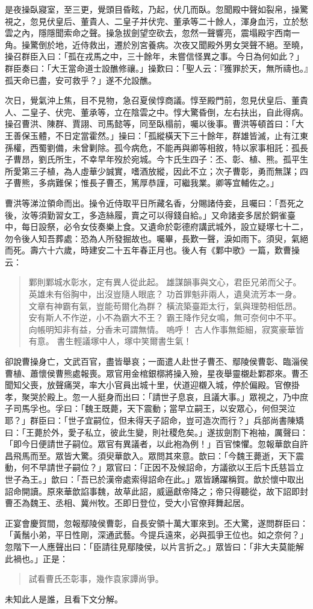 是夜操臥寢室，至三更，覺頭目昏眩，乃起，伏几而臥。忽聞殿中聲如裂帛，操驚視之，忽見伏皇后、董貴人、二皇子并伏完、董承等二十餘人，渾身血污，立於愁雲之內，隱隱聞索命之聲。操急拔劍望空砍去，忽然一聲響亮，震塌殿宇西南一角。操驚倒於地，近侍救出，遷於別宮養病。次夜又聞殿外男女哭聲不絕。至曉，操召群臣入曰：「孤在戎馬之中，三十餘年，未嘗信怪異之事。今日為何如此？」群臣奏曰：「大王當命道士設醮修禳。」操歎曰：「聖人云：『獲罪於天，無所禱也。』孤天命已盡，安可救乎？」遂不允設醮。

次日，覺氣沖上焦，目不見物，急召夏侯惇商議。惇至殿門前，忽見伏皇后、董貴人、二皇子、伏完、董承等，立在陰雲之中。惇大驚昏倒，左右扶出，自此得病。操召曹洪、陳群、賈詡、司馬懿等，同至臥榻前，囑以後事。曹洪等頓首曰：「大王善保玉體，不日定當霍然。」操曰：「孤縱橫天下三十餘年，群雄皆滅，止有江東孫權，西蜀劉備，未曾剿除。孤今病危，不能再與卿等相敘，特以家事相託：孤長子曹昂，劉氏所生，不幸早年歿於宛城。今卞氏生四子：丕、彰、植、熊。孤平生所愛第三子植，為人虛華少誠實，嗜酒放縱，因此不立；次子曹彰，勇而無謀；四子曹熊，多病難保；惟長子曹丕，篤厚恭謹，可繼我業。卿等宜輔佐之。」

曹洪等涕泣領命而出。操令近侍取平日所藏名香，分賜諸侍妾，且囑曰：「吾死之後，汝等須勤習女工，多造絲履，賣之可以得錢自給。」又命諸妾多居於銅雀臺中，每日設祭，必令女伎奏樂上食。又遺命於彰德府講武城外，設立疑塚七十二，勿令後人知吾葬處：恐為人所發掘故也。囑畢，長歎一聲，淚如雨下。須臾，氣絕而死。壽六十六歲，時建安二十五年春正月也。後人有《鄴中歌》一篇，歎曹操云：

\begin{quote}
鄴則鄴城水彰水，定有異人從此起。
雄謀韻事與文心，君臣兄弟而父子。
英雄未有俗胸中，出沒豈隨人眼底？
功首罪魁非兩人，遺臭流芳本一身。
文章有神霸有氣，豈能苟爾化為群？
橫流築臺距太行，氣與理勢相低昂。
安有斯人不作逆，小不為霸大不王？
霸王降作兒女鳴，無可奈何中不平。
向帳明知非有益，分香未可謂無情。
嗚呼！
古人作事無鉅細，寂寞豪華皆有意。
書生輕議塚中人，塚中笑爾書生氣！
\end{quote}

卻說曹操身亡，文武百官，盡皆舉哀；一面遣人赴世子曹丕、鄢陵侯曹彰、臨淄侯曹植、蕭懷侯曹熊處報喪。眾官用金棺銀槨將操入殮，星夜舉靈櫬赴鄴郡來。曹丕聞知父喪，放聲痛哭，率大小官員出城十里，伏道迎櫬入城，停於偏殿。官僚掛孝，聚哭於殿上。忽一人挺身而出曰：「請世子息哀，且議大事。」眾視之，乃中庶子司馬孚也。孚曰：「魏王既薨，天下震動；當早立嗣王，以安眾心，何但哭泣耶？」群臣曰：「世子宜嗣位，但未得天子詔命，豈可造次而行？」兵部尚書陳矯曰：「王薨於外，愛子私立，彼此生變，則社稷危矣。」遂拔劍割下袍袖，厲聲曰：「即今日便請世子嗣位。眾官有異議者，以此袍為例！」百官悚懼。忽報華歆自許昌飛馬而至。眾皆大驚。須臾華歆入。眾問其來意。歆曰：「今魏王薨逝，天下震動，何不早請世子嗣位？」眾官曰：「正因不及候詔命，方議欲以王后卞氏慈旨立世子為王。」歆曰：「吾已於漢帝處索得詔命在此。」眾皆踴躍稱賀。歆於懷中取出詔命開讀。原來華歆諂事魏，故草此詔，威逼獻帝降之；帝只得聽從，故下詔即封曹丕為魏王、丞相、冀州牧。丕即日登位，受大小官僚拜舞起居。

正宴會慶賀間，忽報鄢陵侯曹彰，自長安領十萬大軍來到。丕大驚，遂問群臣曰：「黃鬚小弟，平日性剛，深通武藝。今提兵遠來，必與孤爭王位也。如之奈何？」忽階下一人應聲出曰：「臣請往見鄢陵侯，以片言折之。」眾皆曰：「非大夫莫能解此禍也。」正是：

\begin{quote}
試看曹氏丕彰事，幾作袁家譚尚爭。
\end{quote}

未知此人是誰，且看下文分解。
